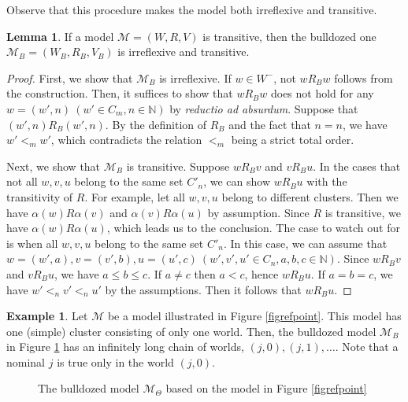 \documentclass{article}
\theoremstyle{definition}
\newtheorem{example}[definition]{Example}
\newtheorem{lemma}[definition]{Lemma}
\newcommand{\Kmodel}{\mathcal{M}}
\begin{document}
Observe that this procedure makes the model both irreflexive and transitive.

\begin{lemma}
    If a model $\Kmodel = (W, R, V)$ is transitive, then the bulldozed one $\Kmodel_B = (W_B, R_B, V_B)$ is irreflexive and transitive.
    \label{lembulldozing}
\end{lemma}
\begin{proof}
    First, we show that $\Kmodel_B$ is irreflexive. If $w \in W^-$, not $w R_B w$ follows from the construction. Then, it suffices to show that $w R_B w$ does not hold for any $w = (w', n) \ (w' \in C_m, n \in \mathbb{N})$ by \textit{reductio ad absurdum}. Suppose that $(w', n) R_B (w', n)$. By the definition of $R_B$ and the fact that $n = n$, we have $w' <_m w'$, which contradicts the relation $<_m$ being a strict total order. 

    Next, we show that $\Kmodel_B$ is transitive. Suppose $w R_B v$ and $v R_B u$. In the cases that not all $w, v, u$ belong to the same set $C'_n$, we can show $w R_B u$ with the transitivity of $R$. For example, let all $w, v, u$ belong to different clusters. Then we have $\alpha(w) R \alpha(v)$ and $\alpha(v) R \alpha(u)$ by assumption. Since $R$ is transitive, we have $\alpha(w) R \alpha(u)$, which leads us to the conclusion. The case to watch out for is when all $w, v, u$ belong to the same set $C'_n$. In this case, we can assume that $w = (w', a), v = (v', b), u = (u', c) \ (w', v', u' \in C_n, a, b, c \in \mathbb{N})$. Since $w R_B v$ and $v R_B u$, we have $a \leq b \leq c$. If $a \neq c$ then $a < c$, hence $w R_B u$. If $a = b = c$, we have $w' <_n v' <_n u'$ by the assumptions. Then it follows that $w R_B u$.
\end{proof}

\begin{example}
    Let $\Kmodel$ be a model illustrated in Figure \ref{figrefpoint}. This model has one (simple) cluster consisting of only one world. Then, the bulldozed model $\Kmodel_B$ in Figure \ref{figbulldozed} has an infinitely long chain of worlds, $(j, 0), (j, 1), \ldots$. Note that a nominal $j$ is true only in the world $(j, 0)$. 
\end{example}

\begin{figure}[tb]
    \centering
    \caption{The bulldozed model $\Kmodel_\Theta$ based on the model in Figure \ref{figrefpoint}}
    \label{figbulldozed}
\end{figure}
\end{document}
